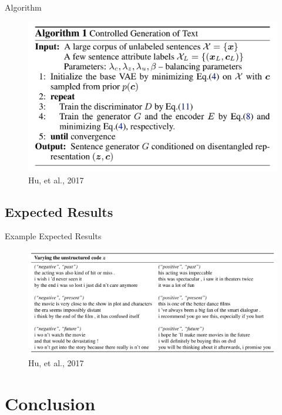 \documentclass{beamer}
\begin{document}
    \begin{frame}{Algorithm}
        \begin{figure}
            \includegraphics[width=\textwidth]{Algorithm}
            \caption{\label{fig:algo}Hu, et al., 2017}
        \end{figure}
    \end{frame}

    \subsection{Expected Results}

    \begin{frame}{Example Expected Results}
        \begin{figure}
            \includegraphics[width=\textwidth]{example}
            \caption{\label{fig:example}Hu, et al., 2017}
        \end{figure}
    \end{frame}

    \section{Conclusion}
\end{document}
